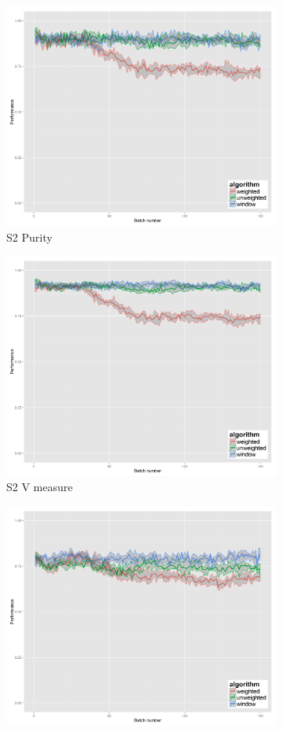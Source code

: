 \begin{figure}[H]
\begin{subfigure}{.45\textwidth}
  \centering
  \includegraphics[width=.7\linewidth]{s_set/s_set_2_ci_one_size_purity.png}
  \caption{S2 Purity}
\end{subfigure}%
\begin{subfigure}{.45\textwidth}
  \centering
  \includegraphics[width=.7\linewidth]{s_set/s_set_2_ci_one_size_vmeasure.png}
  \caption{S2 V measure}
\end{subfigure}
\begin{subfigure}{.45\textwidth}
  \centering
  \includegraphics[width=.7\linewidth]{s_set/s_set_3_ci_one_size_purity.png}

\end{subfigure}
\end{figure}

